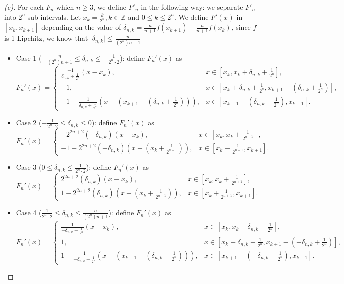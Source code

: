 \begin{proof}[(c)]
    For each $F_n$ which $n \ge 3$, we define $F'_n$ in the following way: we separate $F'_n$ into $2^n$ sub-intervals. Let $x_k = \frac{k}{2^n}, k \in \mathbb{Z}$ and $0 \le k \le 2^n$. We define $F'(x)$ in $[x_k, x_{k+1}]$ depending on the value of $\delta_{n,k} = \frac{n}{n+1} f(x_{k+1}) - \frac{n}{n+1} f(x_{k})$, since $f$ is 1-Lipchitz, we know that $\vert \delta_{n,k}\vert \le \frac{n}{(2^n)n+1}$ 
    \begin{itemize}
        \item Case 1 ($-\frac{n}{(2^n)n+1} \le \delta_{n,k} \le -\frac{1}{2^n \cdot 2}$): define $F_n'(x)$ as
        \[
            F_n'(x) = 
            \begin{cases}
                \frac{-1}{\delta_{n, k} + \frac{1}{2^n}}(x - x_k), & x \in [x_k, x_k + \delta_{n, k} + \frac{1}{2^n}], \\
                -1, & x \in [x_k + \delta_{n,k} + \frac{1}{2^n}, x_{k+1} - (\delta_{n,k} + \frac{1}{2^n})], \\
                -1 + \frac{1}{\delta_{n, k} + \frac{1}{2^n}}(x - (x_{k+1} - (\delta_{n,k} + \frac{1}{2^n}))), & x \in [x_{k+1} - (\delta_{n,k} + \frac{1}{2^n}), x_{k+1}].
            \end{cases}
        \]
        \item Case 2 ($-\frac{1}{2^n \cdot 2} \le \delta_{n,k} \le 0$): define $F_n'(x)$ as
        \[
            F_n'(x) = 
            \begin{cases}
                -2^{2n+2}(-\delta_{n,k})(x - x_k), & x \in [x_k, x_k + \frac{1}{2^{n+1}}], \\
                -1 + 2^{2n+2}(-\delta_{n,k})(x - (x_k + \frac{1}{2^{n+1}})), & x \in [x_k + \frac{1}{2^{n+1}}, x_{k+1}].
            \end{cases}
        \]
        \item Case 3 ($0 \le \delta_{n,k} \le \frac{1}{2^n \cdot 2}$): define $F_n'(x)$ as
        \[
            F_n'(x) = 
            \begin{cases}
                2^{2n+2}(\delta_{n,k})(x - x_k), & x \in [x_k, x_k + \frac{1}{2^{n+1}}], \\
                1 - 2^{2n+2}(\delta_{n,k})(x - (x_k + \frac{1}{2^{n+1}})), & x \in [x_k + \frac{1}{2^{n+1}}, x_{k+1}].
            \end{cases}
        \]
        \item Case 4 ($\frac{1}{2^n \cdot 2} \le \delta_{n,k} \le \frac{n}{(2^n)n+1}$): define $F_n'(x)$ as
        \[
            F_n'(x) = 
            \begin{cases}
                \frac{1}{-\delta_{n, k} + \frac{1}{2^n}}(x - x_k), & x \in [x_k, x_k - \delta_{n, k} + \frac{1}{2^n}], \\
                1, & x \in [x_k - \delta_{n, k} + \frac{1}{2^n}, x_{k+1} - (-\delta_{n,k} + \frac{1}{2^n})], \\
                1 - \frac{1}{-\delta_{n, k} + \frac{1}{2^n}}(x - (x_{k+1} - (\delta_{n,k} + \frac{1}{2^n}))), & x \in [x_{k+1} - (-\delta_{n,k} + \frac{1}{2^n}), x_{k+1}].
            \end{cases}
        \]
    \end{itemize}


\end{proof}
